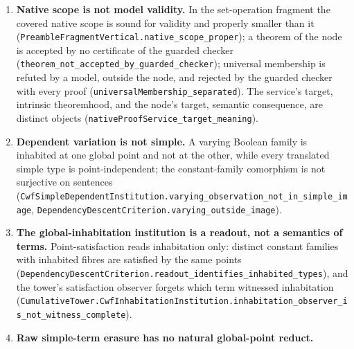 \documentclass[11pt]{article}
\theoremstyle{definition}
\theoremstyle{remark}
\begin{document}
\begin{enumerate}
  This witnesses failure for the term-closed \texttt{HenkinModel} structure;
  it must not be used as an example in the stronger fixed-base institution,
  whose models additionally require extensional-argument congruence.
  The missing congruence is explicitly refuted
  (\nolinkurl{MonotoneBooleanModel.not_functionsRespectEqv}): the observations
  $h\mapsto h(\mathsf{false})$ and
  $h\mapsto h(\mathsf{false})\wedge h(\mathsf{true})$ agree on admitted monotone
  endomaps, yet an admitted higher-order predicate distinguishes their
  behavior on excluded negation. Thus lambda closure and extensional
  congruence are genuinely different obligations.
  Neither the example nor the literal fullness criterion says that every
  non-full model is separated from its standardization by a sentence.
\item \textbf{Native scope is not model validity.}  In the set-operation
  fragment the covered native scope is sound for validity and properly
  smaller than it (\nolinkurl{PreambleFragmentVertical.native_scope_proper});
  a theorem of the node is accepted by no certificate of the guarded checker
  (\nolinkurl{theorem_not_accepted_by_guarded_checker}); universal
  membership is refuted by a model, outside the node, and rejected by the
  guarded checker with every proof (\nolinkurl{universalMembership_separated}). The
  service's target, intrinsic theoremhood, and the node's target, semantic
  consequence, are distinct objects
  (\nolinkurl{nativeProofService_target_meaning}).
\item \textbf{Dependent variation is not simple.}  A varying Boolean family is
  inhabited at one global point and not at the other, while every translated
  simple type is point-independent; the constant-family comorphism is not
  surjective on sentences
  (\nolinkurl{CwfSimpleDependentInstitution.varying_observation_not_in_simple_image},
  \nolinkurl{DependencyDescentCriterion.varying_outside_image}).
\item \textbf{The global-inhabitation institution is a readout, not a
  semantics of terms.}  Point-satisfaction reads inhabitation only: distinct
  constant families with inhabited fibres are satisfied by the same points
  (\nolinkurl{DependencyDescentCriterion.readout_identifies_inhabited_types}),
  and the tower's satisfaction observer forgets which term witnessed
  inhabitation
  (\nolinkurl{CumulativeTower.CwfInhabitationInstitution.inhabitation_observer_is_not_witness_complete}).
\item \textbf{Raw simple-term erasure has no natural global-point reduct.}

\end{enumerate}
\end{document}
